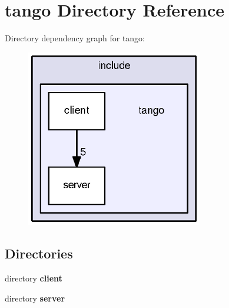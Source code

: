 \section{tango Directory Reference}
\label{dir_4020d0e79f721be2485f92df6601b634}
Directory dependency graph for tango\-:
\nopagebreak
\begin{figure}[H]
\begin{center}
\leavevmode
\includegraphics[width=218pt]{dir_4020d0e79f721be2485f92df6601b634_dep}
\end{center}
\end{figure}
\subsection*{Directories}
\begin{DoxyCompactItemize}
\item 
directory {\bf client}
\item 
directory {\bf server}
\end{DoxyCompactItemize}
